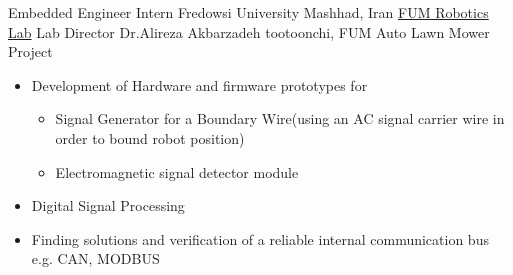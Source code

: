     {Embedded Engineer Intern}
    {Fredowsi University}
    {Mashhad, Iran}
    {
    \newline
    \href{https://www.fumrobotics.ir/people/}{\color{blue}FUM Robotics Lab}
    Lab Director Dr.Alireza Akbarzadeh tootoonchi, FUM Auto Lawn Mower Project
    }
    {
    \begin{itemize}
    \item Development of Hardware and firmware prototypes for 
        \begin{itemize}
            \item  Signal Generator for a Boundary Wire(using an AC signal carrier wire in order to bound robot position)
            \item  Electromagnetic signal detector module
        \end{itemize}
    \item Digital Signal Processing
    \item Finding solutions and verification of a reliable internal communication bus e.g. CAN, MODBUS
    \end{itemize}
    }


